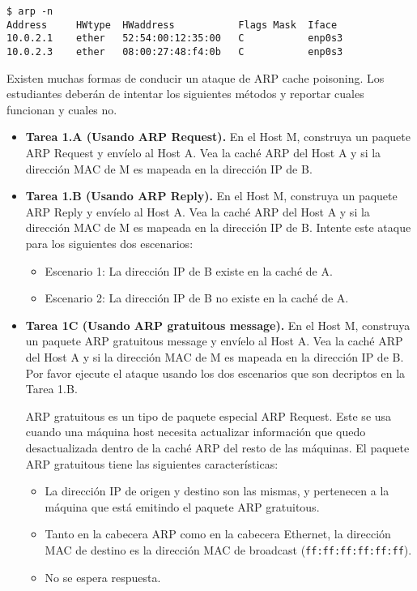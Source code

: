 \begin{lstlisting}
$ arp -n
Address     HWtype  HWaddress           Flags Mask  Iface
10.0.2.1    ether   52:54:00:12:35:00   C           enp0s3
10.0.2.3    ether   08:00:27:48:f4:0b   C           enp0s3
\end{lstlisting}

Existen muchas formas de conducir un ataque de ARP cache poisoning. Los estudiantes deberán de intentar los siguientes métodos y reportar cuales funcionan y cuales no.

\begin{itemize}
\item \textbf{Tarea 1.A (Usando ARP Request).} En el Host M, construya un paquete ARP Request y envíelo al Host A. Vea la caché ARP del Host A y si la dirección MAC de M es mapeada en la dirección IP de B.

\item \textbf{Tarea 1.B (Usando ARP Reply).} En el Host M, construya un paquete ARP Reply y envíelo al Host A. Vea la caché ARP del Host A y si la dirección MAC de M es mapeada en la dirección IP de B.
Intente este ataque para los siguientes dos escenarios:

    \begin{itemize}
      \item Escenario 1: La dirección IP de B existe en la caché de A.
      \item Escenario 2: La dirección IP de B no existe en la caché de A.
    \end{itemize}
     
    
\item \textbf{Tarea 1C (Usando ARP gratuitous message).} En el Host M, construya un paquete ARP gratuitous message y envíelo al Host A. Vea la caché ARP del Host A y si la dirección MAC de M es mapeada en la dirección IP de B.  Por favor ejecute el ataque usando los dos escenarios que son decriptos en la Tarea 1.B.

ARP gratuitous es un tipo de paquete especial ARP Request. Este se usa cuando una máquina host necesita actualizar información que quedo desactualizada dentro de la caché ARP del resto de las máquinas. El paquete ARP gratuitous tiene las siguientes características:

\begin{itemize}
\item La dirección IP de origen y destino son las mismas, y pertenecen a la máquina que está emitindo el paquete ARP gratuitous.

\item Tanto en la cabecera ARP como en la cabecera Ethernet, la dirección MAC de destino es la dirección MAC de broadcast ({\tt ff:ff:ff:ff:ff:ff}).

\item No se espera respuesta.
\end{itemize}
\end{itemize}



